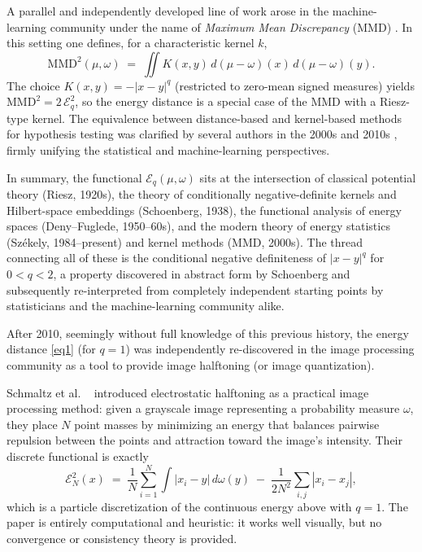 \documentclass[12pt,a4paper,oneside]{amsart}
\theoremstyle{plain}
\theoremstyle{definition}
\numberwithin{equation}{section}
\numberwithin{figure}{section}
\numberwithin{table}{section}
\theoremstyle{remark}
\begin{document}
A parallel and independently developed line of work arose in the machine-learning
community under the name of \emph{Maximum Mean Discrepancy} (MMD) \cite{gretton2006kernel,gretton2012kernel}.
In this setting one defines, for a characteristic kernel $k$,
\[
  \mathrm{MMD}^2(\mu,\omega)
  \;=\;
  \iint K(x,y)\,d(\mu-\omega)(x)\,d(\mu-\omega)(y).
\]
The choice $K(x,y) = -|x-y|^q$ (restricted to zero-mean signed measures) yields
$\mathrm{MMD}^2 = 2\,\mathcal{E}_q^2$, so the energy distance is a special case of the
MMD with a Riesz-type kernel.
The equivalence between distance-based and kernel-based methods for hypothesis testing
was clarified by several authors in the 2000s and 2010s \cite{sejdinovic2013equivalence,lyons2013distance,shen2021exact}, firmly unifying the statistical and machine-learning perspectives.
 
In summary, the functional $\mathcal{E}_q(\mu,\omega)$ sits at the intersection of
classical potential theory (Riesz, 1920s), the theory of conditionally negative-definite
kernels and Hilbert-space embeddings (Schoenberg, 1938), the functional analysis of
energy spaces (Deny--Fuglede, 1950--60s), and the modern theory of energy statistics
(Sz\'ekely, 1984--present) and kernel methods (MMD, 2000s).
The thread connecting all of these is the conditional negative definiteness of
$|x-y|^q$ for $0 < q < 2$, a property discovered in abstract form by Schoenberg and
subsequently re-interpreted from completely independent starting points by
statisticians and the machine-learning community alike.

After 2010, seemingly without full knowledge of this previous history, the energy distance \eqref{eq1} (for $q=1$) was independently re-discovered in the image processing community as a tool to provide image halftoning (or image quantization). 

Schmaltz et al. ~\cite{schmaltz2010electrostatic} introduced electrostatic halftoning
as a practical image processing method: given a grayscale image representing a probability
measure $\omega$, they place $N$ point masses by minimizing an energy that balances pairwise
repulsion between the points and attraction toward the image's intensity.
Their discrete functional is exactly
\[
  \mathcal{E}_N^2(x)
  \;=\;
  \frac1N\sum_{i=1}^N \int |x_i - y|\,d\omega(y)
  \;-\;
  \frac{1}{2N^2}\sum_{i,j} |x_i - x_j|,
\]
which is a particle discretization of the continuous energy above with $q=1$.
The paper is entirely computational and heuristic: it works well visually, but
no convergence or consistency theory is provided.
 
\end{document}
